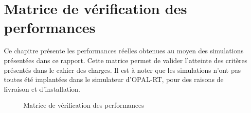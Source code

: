 \chapter{Matrice de vérification des performances}
Ce chapitre présente les performances réelles obtenues au moyen des simulations présentées dans ce rapport. Cette matrice permet de valider l'atteinte des critères présentés dans le cahier des charges. Il est à noter que les simulations n'ont pas toutes été implantées dans le simulateur d'OPAL-RT, pour des raisons de livraison et d'installation.
\begin{figure}[htb]
\centering
{}
\caption{Matrice de vérification des performances}
\label{matrice}
\end{figure}
